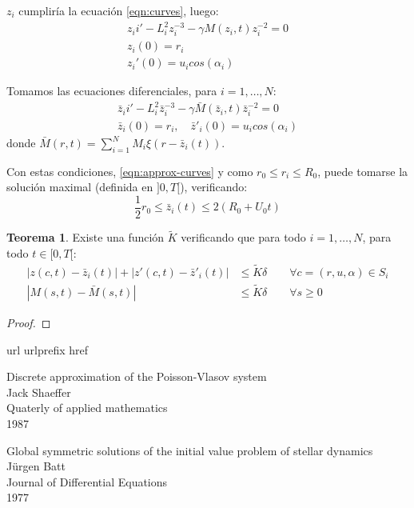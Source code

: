 \documentclass[a4paper,10pt]{scrartcl}
\theoremstyle{definition}
\newtheorem{theorem}{Teorema}
\newcommand{\tildek}{\widetilde{K}}
\numberwithin{equation}{section}
\begin{document}
$z_i$ cumpliría la ecuación \eqref{eqn:curves}, luego:
\begin{align*}
 z_ii' - L_i^2 z_i^{-3} - \gamma M(z_i, t) z_i^{-2} = 0\\
 z_i(0) = r_i\\
 z_i'(0) = u_i cos(\alpha_i)
\end{align*}

Tomamos las ecuaciones diferenciales, para $i=1, \ldots, N$:
\begin{align}
 \label{eqn:approx-curves}
 \bar{z}_ii' - L_i^{2} \bar{z}_i^{-3} - \gamma \bar{M}(\bar{z}_i, t) \bar{z}_i^{-2} = 0\\
 \bar{z}_i(0) = r_i, \quad \bar{z}'_i(0) = u_i cos(\alpha_i) \nonumber
\end{align}
donde $\bar{M}(r,t) = \sum_{i=1}^N M_i \xi(r-\bar{z}_i(t))$.

Con estas condiciones, \eqref{eqn:approx-curves} y como $r_0 \le r_i \le R_0$, puede tomarse la solución maximal (definida en $]0,T[$), verificando:
\[
    \frac{1}{2}r_0 \le \bar{z}_i(t) \le 2(R_0 + U_0t)
\]

\begin{theorem}
 Existe una función $\widetilde{K}$ verificando que para todo $i = 1, \ldots, N$, para todo $t\in [0,T[$:
 \begin{align*}
  |z(c,t) - \bar{z}_i(t)| + |z'(c,t) - \bar{z}'_i(t)| &\le \tildek\delta \qquad \forall c= (r,u,\alpha) \in S_i \\
  |M(s,t) - \bar{M}(s,t)| &\le \tildek\delta \qquad \forall s \ge 0
 \end{align*}
\end{theorem}

\begin{proof}
 
\end{proof}


\newpage
\begin{thebibliography}{10}
    \expandafter\ifx\csname url\endcsname\relax
    \def\url#1{\texttt{#1}}\fi
    \expandafter\ifx\csname urlprefix\endcsname\relax\def\urlprefix{URL }\fi
    \expandafter\ifx\csname href\endcsname\relax
    \def\href#1#2{#2} \def\path#1{#1}\fi
    
    Discrete approximation of the Poisson-Vlasov system\\
    Jack Shaeffer\\
    Quaterly of applied mathematics\\
    1987
    
    Global symmetric solutions of the initial value problem of stellar dynamics\\
    Jürgen Batt\\
    Journal of Differential Equations\\
    1977
\end{thebibliography}
	
\end{document}
